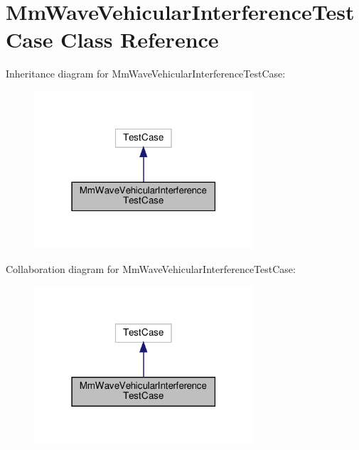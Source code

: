 \hypertarget{classMmWaveVehicularInterferenceTestCase}{}\section{Mm\+Wave\+Vehicular\+Interference\+Test\+Case Class Reference}
\label{classMmWaveVehicularInterferenceTestCase}


Inheritance diagram for Mm\+Wave\+Vehicular\+Interference\+Test\+Case\+:\nopagebreak
\begin{figure}[H]
\begin{center}
\leavevmode
\includegraphics[width=231pt]{classMmWaveVehicularInterferenceTestCase__inherit__graph}
\end{center}
\end{figure}


Collaboration diagram for Mm\+Wave\+Vehicular\+Interference\+Test\+Case\+:\nopagebreak
\begin{figure}[H]
\begin{center}
\leavevmode
\includegraphics[width=231pt]{classMmWaveVehicularInterferenceTestCase__coll__graph}
\end{center}
\end{figure}
